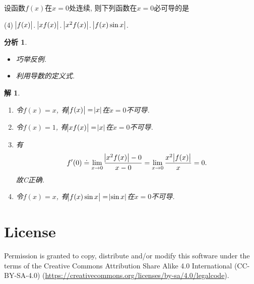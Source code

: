 \documentclass[a4paper, 12pt]{ctexart}
\theoremstyle{plain}
\theoremstyle{nonumberplain}
\newtheorem{solution}{解}
\theoremstyle{nonumberplain}
\newtheorem{analysis}{分析}
\theoremstyle{nonumberplain}
\newcommand{\ans}[1]{\textcolor{Aquamarine}{#1}}
\begin{document}
    \begin{problem}
        设函数$f(x)$在$x=0$处连续, 则下列函数在$x=0$必可导的是
        \begin{tasks}(4)
            \task $\abs{f(x)}$.
            \task $\abs{xf(x)}$.
            \task[\ans{(C)}] \ans{$\abs{x^2f(x)}$}.
            \task $\abs{f(x)\sin x}$.
        \end{tasks}
    \end{problem}
    \begin{analysis}\hspace{\fill}
        \begin{itemize}
            \item 巧举反例.
            \item 利用导数的定义式.
        \end{itemize}
    \end{analysis}
    \begin{solution}\hspace{\fill}
        \begin{enumerate}[\hspace{2em}A:]
            \item 令$f(x)=x$, 有$\abs{f(x)}=\abs{x}$在$x=0$不可导.
            \item 令$f(x)=1$, 有$\abs{xf(x)}=\abs{x}$在$x=0$不可导.
            \item 有
            \begin{equation}
                f'(0)\doteq \lim_{x\to 0}\frac{\abs{x^2f(x)}-0}{x-0}=\lim_{x\to 0}\frac{x^2\abs{f(x)}}{x}=0.
            \end{equation}
            故C正确.
            \item 令$f(x)=x$, 有$\abs{f(x)\sin x}=\abs{\sin x}$在$x=0$不可导.
        \end{enumerate}
    \end{solution}

    \section{License}

    Permission is granted to copy, distribute and/or modify this software under the terms of the Creative Commons Attribution Share Alike 4.0 International (CC-BY-SA-4.0) (\url{https://creativecommons.org/licenses/by-sa/4.0/legalcode}).
\end{document}
